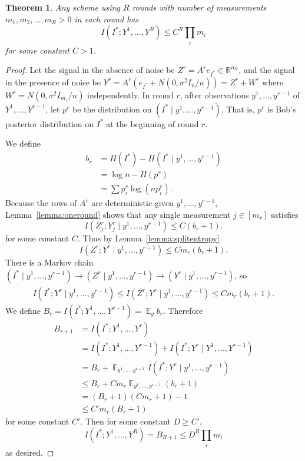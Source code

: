 \documentclass[twoside,leqno,twocolumn]{article}
\newtheorem{theorem}{Theorem}[section]
\DeclareMathOperator*{\E}{\mathbb{E}}
\def\R{\mathbb{R}}
\begin{document}
\begin{theorem}
  Any scheme using $R$ rounds with number of measurements $m_1, m_2,
  \dotsc, m_R > 0$ in each round has
  \[
  I(I^*; Y^1, \dotsc, Y^R) \leq C^R\prod_i m_i
  \]
  for some constant $C > 1$.
\end{theorem}
\begin{proof}
  Let the signal in the absence of noise be $Z^r = A^re_{I^*} \in
  \R^{m_r}$, and the signal in the presence of noise be $Y^r =
  A^r(e_{I^*} + N(0, \sigma^2 I_n / n)) = Z^r + W^r$ where $W^r = N(0,
  \sigma^2I_{m_r}/n)$ independently.  In round $r$, after observations
  $y^1, \dotsc, y^{r-1}$ of $Y^1, \dotsc, Y^{r-1}$, let $p^r$ be the
  distribution on $(I^* \mid y^1, \dotsc, y^{r-1})$.  That is, $p^r$
  is Bob's posterior distribution on $I^*$ at the beginning of round
  $r$.

  We define
  \begin{align*}
  b_r &= H(I^*) - H(I^* \mid y^1, \dotsc, y^{r-1})\\
  &= \log n - H(p^r)\\
  &= \sum p^r_i \log (n p^r_i).
  \end{align*}
  Because the rows of $A^r$ are deterministic given $y^1, \dotsc,
  y^{r-1}$, Lemma~\ref{lemma:oneround} shows that any single
  measurement $j \in [m_r]$ satisfies
  \[
  I(Z^r_j; Y^r_j  \mid y^1, \dotsc, y^{r-1}) \leq C(b_r+1).
  \]
  for some constant $C$.  Thus by Lemma~\ref{lemma:splitentropy}
  \[
  I(Z^r; Y^r  \mid y^1, \dotsc, y^{r-1}) \leq Cm_r(b_r+1).
  \]
  There is a Markov chain $(I^* \mid y^1, \dotsc, y^{r-1}) \to (Z^r
  \mid y^1, \dotsc, y^{r-1}) \to (Y^r \mid y^1, \dotsc, y^{r-1})$, so
  \begin{align*}
    I(I^*; Y^r \mid y^1, \dotsc, y^{r-1})
\leq I(Z^r; Y^r \mid y^1, \dotsc, y^{r-1}) 
\leq Cm_r(b_r + 1).
  \end{align*}
  We define $B_r = I(I^*; Y^1, \dotsc, Y^{r-1}) = \E_{y} b_r$.  Therefore
  \begin{align*}
    B_{r+1}
    &= I(I^*; Y^1, \dotsc, Y^r) \\
    &= I(I^*; Y^1, \dotsc, Y^{r-1}) + I(I^*; Y^r \mid Y^1, \dotsc, Y^{r-1})\\
    &= B_r + \E_{y^1, \dotsc, y^{r-1}} I(I^*; Y^r \mid y^1, \dotsc, y^{r-1})\\
    &\leq B_r + Cm_r \E_{y^1, \dotsc, y^{r-1}} (b_r+1) \\
    &= (B_r+1)(Cm_r + 1) - 1\\
    &\leq C'm_r (B_r + 1)
  \end{align*}
  for some constant $C'$.  Then for some constant $D \geq C'$,
  \[
  I(I^*; Y^1, \dotsc, Y^R) = B_{R+1} \leq D^R\prod_i m_i
  \]
  as desired.
\end{proof}
\end{document}
